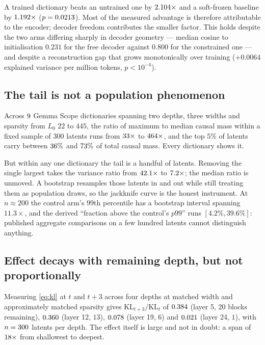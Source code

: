 \documentclass[11pt]{article}
\begin{document}
A trained dictionary beats an untrained one by $2.104\times$ and a
soft-frozen baseline by $1.192\times$ ($p=0.0213$). Most of the
measured advantage is therefore attributable to the encoder; decoder freedom
contributes the smaller factor. This holds despite the two arms differing sharply
in decoder geometry --- median cosine to initialisation $0.231$ for the free
decoder against $0.800$ for the constrained one --- and despite a reconstruction
gap that grows monotonically over training ($+0.0064$ explained variance per
million tokens, $p<10^{-4}$).

\subsection{The tail is not a population phenomenon}
Across $9$ Gemma Scope dictionaries spanning two depths, three widths and
sparsity from $L_0$ $22$ to $445$, the ratio of maximum to median causal mass
within a fixed sample of $300$ latents runs from $33\times$ to
$464\times$, and the top $5\%$ of latents carry between
$36\%$ and $73\%$ of total causal mass. Every dictionary shows
it.

But within any one dictionary the tail is a handful of latents. Removing the
single largest takes the variance ratio from $42.1\times$ to
$7.2\times$; the median ratio is unmoved. A bootstrap resamples those
latents in and out while still treating them as population draws, so the jackknife
curve is the honest instrument. At $n\approx200$ the control arm's $99$th
percentile has a bootstrap interval spanning $11.3\times$, and the derived
``fraction above the control's $p99$'' runs $[4.2\%, 39.6\%]$: published aggregate
comparisons on a few hundred latents cannot distinguish anything.

\subsection{Effect decays with remaining depth, but not proportionally}
Measuring \eqref{eq:kl} at $t$ and $t{+}3$ across four depths at matched width and
approximately matched sparsity gives $\mathrm{KL}_{t+3}/\mathrm{KL}_t$ of
$0.384$ (layer 5, $20$ blocks remaining), $0.360$ (layer 12,
$13$), $0.078$ (layer 19, $6$) and $0.021$ (layer 24, $1$),
with $n=300$ latents per depth. The effect itself is large and not in
doubt: a span of $18\times$ from shallowest to deepest.
\end{document}
